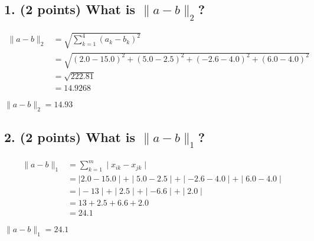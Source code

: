 \documentclass[11pt]{article}
\begin{document}
\subsection*{\textbf{1. (2 points)} What is $\|a-b\|_2$?}


\begin{align*}
    \|a-b\|_2 &= \sqrt{ \sum_{k=1}^{4} ( a_{k} - b_{k} )^{2} } \\
    & = \sqrt{ ( 2.0 - 15.0 )^{2} + ( 5.0 - 2.5 )^{2} + ( -2.6 - 4.0 )^{2} + ( 6.0 - 4.0 )^{2} } \\
    & = \sqrt{ 222.81 } \\
    & = 14.9268
\end{align*}

\begin{tcolorbox}[title=Problem 3.1]
    $\|a-b\|_2 = 14.93$
\end{tcolorbox}


\subsection*{\textbf{2. (2 points)} What is $\|a-b\|_1$?}


\begin{align*}
    \|a-b\|_1 &= \sum_{k=1}^{m}  \mid x_{ik} - x_{jk} \mid  \\
    &= \mid 2.0 - 15.0 \mid + \mid 5.0 - 2.5 \mid + \mid -2.6 - 4.0 \mid + \mid 6.0 - 4.0 \mid \\
    &= \mid -13 \mid + \mid 2.5 \mid + \mid -6.6 \mid + \mid 2.0 \mid \\
    &= 13 + 2.5 + 6.6 + 2.0 \\
    &= 24.1
\end{align*}

\begin{tcolorbox}[title=Problem 3.2]
    $\|a-b\|_1 = 24.1$
\end{tcolorbox}
\end{document}
